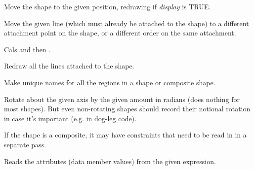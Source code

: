 Move the shape to the given position, redrawing if {\it display} is TRUE.

\label{wxshapemovelinetonewattachment}


Move the given line (which must already be attached to the shape) to 
a different attachment point on the shape, or a different order on the same attachment.

Cals  and then .



Redraw all the lines attached to the shape.



Make unique names for all the regions in a shape or composite shape.



Rotate about the given axis by the given amount in radians (does nothing
for most shapes). But even non-rotating shapes should record their
notional rotation in case it's important (e.g. in dog-leg code).



If the shape is a composite, it may have constraints that need to be read in in a separate pass.



Reads the attributes (data member values) from the given expression.



